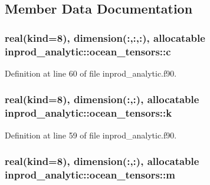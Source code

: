 \subsection{Member Data Documentation}
\hypertarget{structinprod__analytic_1_1ocean__tensors_a146670849488f50eff7b1937077a67ff}{
\subsubsection[{c}]{\setlength{\rightskip}{0pt plus 5cm}real(kind=8), dimension(\-:,\-:,\-:), allocatable inprod\-\_\-analytic\-::ocean\-\_\-tensors\-::c\hspace{0.3cm}{\ttfamily [private]}}}\label{structinprod__analytic_1_1ocean__tensors_a146670849488f50eff7b1937077a67ff}


Definition at line 60 of file inprod\-\_\-analytic.\-f90.

\hypertarget{structinprod__analytic_1_1ocean__tensors_a1ab0d8f229b274e954a53cc1ce40cac1}{
\subsubsection[{k}]{\setlength{\rightskip}{0pt plus 5cm}real(kind=8), dimension(\-:,\-:), allocatable inprod\-\_\-analytic\-::ocean\-\_\-tensors\-::k\hspace{0.3cm}{\ttfamily [private]}}}\label{structinprod__analytic_1_1ocean__tensors_a1ab0d8f229b274e954a53cc1ce40cac1}


Definition at line 59 of file inprod\-\_\-analytic.\-f90.

\hypertarget{structinprod__analytic_1_1ocean__tensors_a6f8f8b2b4ef239db0a9f751d7e8452e8}{
\subsubsection[{m}]{\setlength{\rightskip}{0pt plus 5cm}real(kind=8), dimension(\-:,\-:), allocatable inprod\-\_\-analytic\-::ocean\-\_\-tensors\-::m\hspace{0.3cm}{\ttfamily [private]}}}\label{structinprod__analytic_1_1ocean__tensors_a6f8f8b2b4ef239db0a9f751d7e8452e8}



